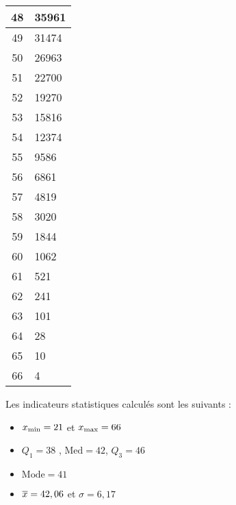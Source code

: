 \begin{center}
\begin{tabular}[t]{|c|l|}
\hline
48 & 35961\\
\hline
49 & 31474\\
\hline
50 & 26963\\
\hline
51 & 22700\\
\hline
52 & 19270\\
\hline
53 & 15816\\
\hline
54 & 12374\\
\hline
55 & 9586\\
\hline
56 & 6861\\
\hline
57 & 4819\\
\hline
58 & 3020\\
\hline
59 & 1844\\
\hline
60 & 1062\\
\hline
61 & 521\\
\hline
62 & 241\\
\hline
63 & 101\\
\hline
64 & 28\\
\hline
65 & 10\\
\hline
66 & 4\\
\hline
\end{tabular}
\end{center}

Les indicateurs statistiques calculés sont les suivants :
\begin{itemize}
\item $x_{\text{min}}=21$ et $x_{\text{max}}=66$
\item $Q_1=38$ , $\text{Med}=42$, $Q_3=46$
\item $\text{Mode}=41$
\item $\overline{x}=42,06$ et $\sigma=6,17$
\end{itemize}
